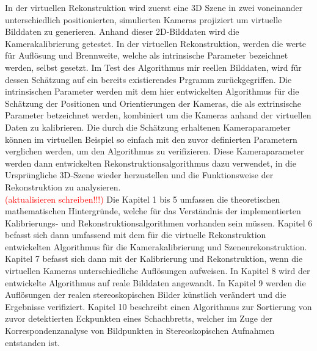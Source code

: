 In der virtuellen Rekonstruktion wird zuerst eine 3D Szene in zwei voneinander unterschiedlich positionierten, simulierten Kameras projiziert um virtuelle Bilddaten zu generieren. Anhand dieser 2D-Bilddaten wird die Kamerakalibrierung getestet. In der virtuellen Rekonstruktion, werden die werte für Auflösung und Brennweite, welche als intrinsische Parameter bezeichnet werden, selbst gesetzt. Im Test des Algorithmus mir reellen Bilddaten, wird für dessen Schätzung auf ein bereits existierendes Prgramm zurückgegriffen. Die intrinsischen Parameter werden mit dem hier entwickelten Algorithmus für die Schätzung der Positionen und Orientierungen der Kameras, die als extrinsische Parameter betzeichnet werden, kombiniert um die Kameras anhand der virtuellen Daten zu kalibrieren. Die durch die Schätzung erhaltenen Kameraparameter können im virtuellen Beispiel so einfach mit den zuvor definierten Parametern verglichen werden, um den Algorithmus zu verifizieren. Diese Kameraparameter werden dann entwickelten Rekonstruktionsalgorithmus dazu verwendet, in die Ursprüngliche 3D-Szene wieder herzustellen und die Funktionsweise der Rekonstruktion zu analysieren. \\

\textcolor{red}{(aktualisieren schreiben!!!)}
Die Kapitel 1 bis 5 umfassen die theoretischen mathematischen Hintergründe, welche für das Verständnis der implementierten Kalibrierungs- und Rekonstruktionsalgorithmen vorhanden sein müssen. Kapitel 6 befasst sich dann umfassend mit dem für die virtuelle Rekonstruktion entwickelten Algorithmus für die Kamerakalibrierung und Szenenrekonstruktion. Kapitel 7 befasst sich dann mit der Kalibrierung und Rekonstruktion, wenn die virtuellen Kameras unterschiedliche Auflösungen aufweisen. In Kapitel 8 wird der entwickelte Algorithmus auf reale Bilddaten angewandt. In Kapitel 9 werden die Auflösungen der realen stereoskopischen Bilder künstlich verändert und die Ergebnisse verifiziert. Kapitel 10 beschreibt einen Algorithmus zur Sortierung von zuvor detektierten Eckpunkten eines Schachbretts, welcher im Zuge der Korrespondenzanalyse von Bildpunkten in Stereoskopischen Aufnahmen entstanden ist.

